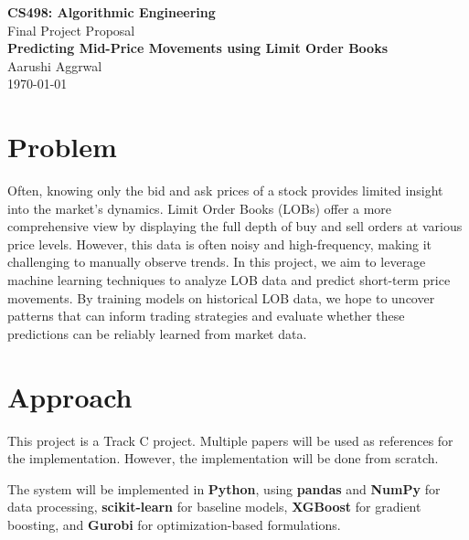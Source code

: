 \documentclass[11pt]{article}
\begin{document}
\begin{center}
    {\Large \textbf{CS498: Algorithmic Engineering}} \\
    \vspace{2mm}
    {\large Final Project Proposal} \\
    \vspace{4mm}
    \textbf{Predicting Mid-Price Movements using Limit Order Books} \\
    \vspace{2mm}
    Aarushi Aggrwal \\
    \today
\end{center}

\vspace{5mm}

\section*{Problem}
Often, knowing only the bid and ask prices of a stock provides limited insight into the market's dynamics. Limit Order Books (LOBs) offer a more comprehensive view by displaying the full depth of buy and sell orders at various price levels. However, this data is often noisy and high-frequency, making it challenging to manually observe trends. In this project, we aim to leverage machine learning techniques to analyze LOB data and predict short-term price movements. By training models on historical LOB data, we hope to uncover patterns that can inform trading strategies and evaluate whether these predictions can be reliably learned from market data.

\section*{Approach}
This project is a Track C project. Multiple papers will be used as references for the implementation. However, the implementation will be done from scratch.

The system will be implemented in \textbf{Python}, using \textbf{pandas} and \textbf{NumPy} for data processing, \textbf{scikit-learn} for baseline models, \textbf{XGBoost} for gradient boosting, and \textbf{Gurobi} for optimization-based formulations.
\end{document}
